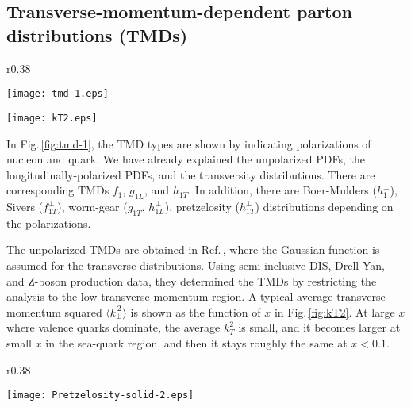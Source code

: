 \documentclass{PoS}
\begin{document}
\vfill\eject
\subsection{Transverse-momentum-dependent parton distributions (TMDs)}
\label{tmds}

\begin{wrapfigure}[17]{r}{0.38\textwidth}
   \vspace{-0.8cm} 
   \begin{center}
     \texttt{[image: tmd-1.eps]}
\vspace{-0.20cm}
\caption{Various TMDs with nucleon and quark polarizations.}
\label{fig:tmd-1}
\vspace{+0.30cm}
     \texttt{[image: kT2.eps]}
\vspace{-0.40cm}
\caption{Transverse-momentum squared average \cite{unpol-tmds-2017}.}
\label{fig:kT2}
   \end{center}
\end{wrapfigure}

In Fig.\,\ref{fig:tmd-1}, the TMD types are shown by indicating 
polarizations of nucleon and quark. 
We have already explained the unpolarized PDFs, 
the longitudinally-polarized PDFs, 
and the transversity distributions.
There are corresponding TMDs $f_1$, $g_{1L}$, and $h_{1T}$.
In addition, there are Boer-Mulders ($h_1^\perp$), 
Sivers ($f_{1T}^\perp$), worm-gear ($g_{1T}$, $h_{1L}^\perp$), 
pretzelosity ($h_{1T}^\perp$) distributions depending on the polarizations.

The unpolarized TMDs are obtained in Ref.\,\cite{unpol-tmds-2017},
where the Gaussian function is assumed for the transverse distributions.
Using semi-inclusive DIS, Drell-Yan, and Z-boson production data,
they determined the TMDs by restricting the analysis to 
the low-transverse-momentum region.
A typical average transverse-momentum squared 
$\langle k_\perp^{\, 2} \rangle$
is shown as the function of $x$ in Fig.\,\ref{fig:kT2}.
At large $x$ where valence quarks dominate,
the average $k_T^2$ is small, and it becomes larger at small $x$
in the sea-quark region, and then it stays roughly the same at $x<0.1$.

\begin{wrapfigure}[9]{r}{0.38\textwidth}
   \vspace{-0.7cm} 
   \begin{center}
     \texttt{[image: Pretzelosity-solid-2.eps]}
   \end{center}
\vspace{-0.70cm}
\caption{Pretzelosity and SoLId \cite{Pretzelosity-solid}.}
\label{fig:Pretzelosity-solid}
\vspace{-0.60cm}
\end{wrapfigure}
\end{document}
